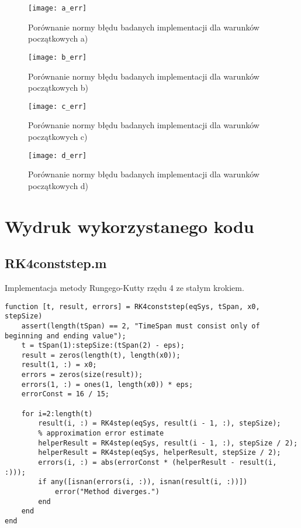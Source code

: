 \documentclass[12pt]{article}
\begin{document}
\begin{figure}[!htbp]
\centering
\texttt{[image: a\_err]}
\centering
\caption{Porównanie normy błędu badanych implementacji dla warunków początkowych a)}
\label{fig:a_err}
\end{figure}
\FloatBarrier

\begin{figure}[!htbp]
\centering
\texttt{[image: b\_err]}
\centering
\caption{Porównanie normy błędu badanych implementacji dla warunków początkowych b)}
\label{fig:b_err}
\end{figure}
\FloatBarrier

\begin{figure}[!htbp]
\centering
\texttt{[image: c\_err]}
\centering
\caption{Porównanie normy błędu badanych implementacji dla warunków początkowych c)}
\label{fig:c_err}
\end{figure}
\FloatBarrier

\begin{figure}[!htbp]
\centering
\texttt{[image: d\_err]}
\centering
\caption{Porównanie normy błędu badanych implementacji dla warunków początkowych d)}
\label{fig:d_err}
\end{figure}
\FloatBarrier

\clearpage
\section{Wydruk wykorzystanego kodu}

\subsection{RK4conststep.m}
Implementacja metody Rungego-Kutty rzędu 4 ze stałym krokiem.
\begin{verbatim}
function [t, result, errors] = RK4conststep(eqSys, tSpan, x0, stepSize)
    assert(length(tSpan) == 2, "TimeSpan must consist only of beginning and ending value");
    t = tSpan(1):stepSize:(tSpan(2) - eps);
    result = zeros(length(t), length(x0));
    result(1, :) = x0;
    errors = zeros(size(result));
    errors(1, :) = ones(1, length(x0)) * eps;
    errorConst = 16 / 15;

    for i=2:length(t)
        result(i, :) = RK4step(eqSys, result(i - 1, :), stepSize);
        % approximation error estimate
        helperResult = RK4step(eqSys, result(i - 1, :), stepSize / 2);
        helperResult = RK4step(eqSys, helperResult, stepSize / 2);
        errors(i, :) = abs(errorConst * (helperResult - result(i, :)));
        if any([isnan(errors(i, :)), isnan(result(i, :))])
            error("Method diverges.")
        end
    end
end
\end{verbatim}
\end{document}
